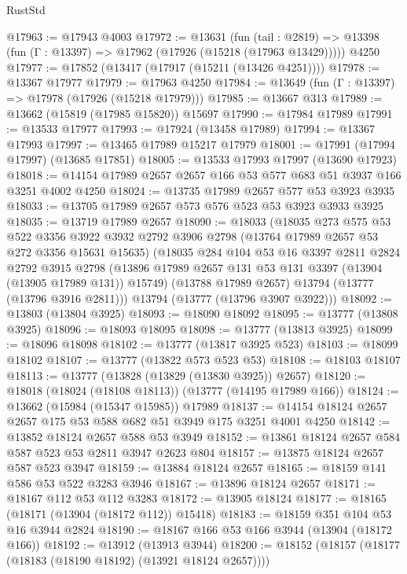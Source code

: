 \begin{lexlean}{RustStd}
\begin{coremodule}
@17963 := @17943 @4003
@17972 := @13631
    (fun (tail : @2819) => @13398 (fun (Γ : @13397) => @17962 (@17926 (@15218 (@17963 @13429)))))
    @4250
@17977 := @17852 (@13417 (@17917 (@15211 (@13426 @4251))))
@17978 := @13367 @17977
@17979 := @17963 @4250
@17984 := @13649 (fun (Γ : @13397) => @17978 (@17926 (@15218 @17979)))
@17985 := @13667 @313
@17989 := @13662 (@15819 (@17985 @15820)) @15697
@17990 := @17984 @17989
@17991 := @13533 @17977
@17993 := @17924 (@13458 @17989)
@17994 := @13367 @17993
@17997 := @13465 @17989 @15217 @17979
@18001 := @17991 (@17994 @17997) (@13685 @17851)
@18005 := @13533 @17993 @17997 (@13690 @17923)
@18018 := @14154 @17989 @2657 @2657 @166 @53 @577 @683 @51 @3937 @166 @3251 @4002 @4250
@18024 := @13735 @17989 @2657 @577 @53 @3923 @3935
@18033 := @13705 @17989 @2657 @573 @576 @523 @53 @3923 @3933 @3925
@18035 := @13719 @17989 @2657
@18090 := @18033
    (@18035
      @273
      @575
      @53
      @522
      @3356
      @3922
      @3932
      @2792
      @3906
      @2798
      (@13764 @17989 @2657 @53 @272 @3356 @15631 @15635)
      (@18035
        @284
        @104
        @53
        @16
        @3397
        @2811
        @2824
        @2792
        @3915
        @2798
        (@13896 @17989 @2657 @131 @53 @131 @3397 (@13904 (@13905 @17989 @131)) @15749)
        (@13788 @17989 @2657)
        @13794
        (@13777 (@13796 @3916 @2811)))
      @13794
      (@13777 (@13796 @3907 @3922)))
@18092 := @13803 (@13804 @3925)
@18093 := @18090 @18092
@18095 := @13777 (@13808 @3925)
@18096 := @18093 @18095
@18098 := @13777 (@13813 @3925)
@18099 := @18096 @18098
@18102 := @13777 (@13817 @3925 @523)
@18103 := @18099 @18102
@18107 := @13777 (@13822 @573 @523 @53)
@18108 := @18103 @18107
@18113 := @13777 (@13828 (@13829 (@13830 @3925)) @2657)
@18120 := @18018 (@18024 (@18108 @18113)) (@13777 (@14195 @17989 @166))
@18124 := @13662 (@15984 (@15347 @15985)) @17989
@18137 := @14154 @18124 @2657 @2657 @175 @53 @588 @682 @51 @3949 @175 @3251 @4001 @4250
@18142 := @13852 @18124 @2657 @588 @53 @3949
@18152 := @13861 @18124 @2657 @584 @587 @523 @53 @2811 @3947 @2623 @804
@18157 := @13875 @18124 @2657 @587 @523 @3947
@18159 := @13884 @18124 @2657
@18165 := @18159 @141 @586 @53 @522 @3283 @3946
@18167 := @13896 @18124 @2657
@18171 := @18167 @112 @53 @112 @3283
@18172 := @13905 @18124
@18177 := @18165 (@18171 (@13904 (@18172 @112)) @15418)
@18183 := @18159 @351 @104 @53 @16 @3944 @2824
@18190 := @18167 @166 @53 @166 @3944 (@13904 (@18172 @166))
@18192 := @13912 (@13913 @3944)
@18200 := @18152 (@18157 (@18177 (@18183 (@18190 @18192) (@13921 @18124 @2657))))

\end{coremodule}
\end{lexlean}
